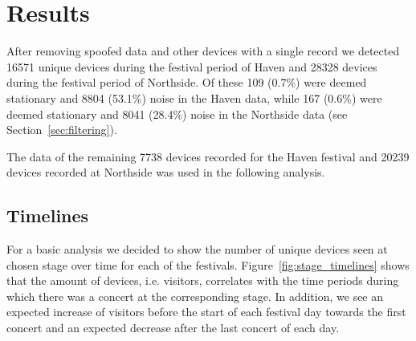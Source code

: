 \section{Results} \label{results}
After removing spoofed data and other devices with a single record we detected 16571 unique devices during the festival period of Haven and 28328 devices during the festival period of Northside. Of these 109 (0.7\%) were deemed stationary and 8804 (53.1\%) noise in the Haven data, while 167 (0.6\%) were deemed stationary and 8041 (28.4\%) noise in the Northside data (see Section~\ref{sec:filtering}).

The data of the remaining 7738 devices recorded for the Haven festival and 20239 devices recorded at Northside was used in the following analysis.  

\subsection{Timelines}
For a basic analysis we decided to show the number of unique devices seen at chosen stage over time for each of the festivals. Figure~\ref{fig:stage_timelines} shows that the amount of devices, i.e. visitors, correlates with the time periods during which there was a concert at the corresponding stage. In addition, we see an expected increase of visitors before the start of each festival day towards the first concert and an expected decrease after the last concert of each day.

